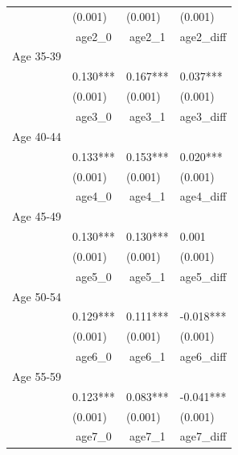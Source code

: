 \begin{table}[t]
\begin{center}
{\begin{tabular}{llll}
                    &     (0.001)   &     (0.001)   &     (0.001)   \\
                    &\multicolumn{1}{c}{age2_0}&\multicolumn{1}{c}{age2_1}&\multicolumn{1}{c}{age2_diff}\\
Age 35-39           &               &               &               \\
                    &       0.130***&       0.167***&       0.037***\\
                    &     (0.001)   &     (0.001)   &     (0.001)   \\
                    &\multicolumn{1}{c}{age3_0}&\multicolumn{1}{c}{age3_1}&\multicolumn{1}{c}{age3_diff}\\
Age 40-44           &               &               &               \\
                    &       0.133***&       0.153***&       0.020***\\
                    &     (0.001)   &     (0.001)   &     (0.001)   \\
                    &\multicolumn{1}{c}{age4_0}&\multicolumn{1}{c}{age4_1}&\multicolumn{1}{c}{age4_diff}\\
Age 45-49           &               &               &               \\
                    &       0.130***&       0.130***&       0.001   \\
                    &     (0.001)   &     (0.001)   &     (0.001)   \\
                    &\multicolumn{1}{c}{age5_0}&\multicolumn{1}{c}{age5_1}&\multicolumn{1}{c}{age5_diff}\\
Age 50-54           &               &               &               \\
                    &       0.129***&       0.111***&      -0.018***\\
                    &     (0.001)   &     (0.001)   &     (0.001)   \\
                    &\multicolumn{1}{c}{age6_0}&\multicolumn{1}{c}{age6_1}&\multicolumn{1}{c}{age6_diff}\\
Age 55-59           &               &               &               \\
                    &       0.123***&       0.083***&      -0.041***\\
                    &     (0.001)   &     (0.001)   &     (0.001)   \\
                    &\multicolumn{1}{c}{age7_0}&\multicolumn{1}{c}{age7_1}&\multicolumn{1}{c}{age7_diff}\\

\end{tabular}}
\end{center}
\end{table}
